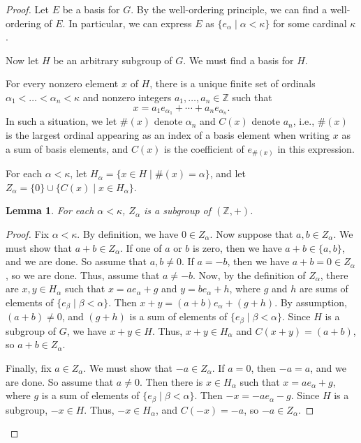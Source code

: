 \documentclass[a4paper]{memoir}
\newtheorem{lemma}[theorem]{Lemma}
\theoremstyle{definition}
\newcommand{\bb}{\mathbb}
\begin{document}
\begin{proof}
  Let $E$ be a basis for $G$. By the well-ordering principle, we can find a well-ordering of $E$. 
  In particular, we can express $E$ as $\{e_\alpha \mid \alpha < \kappa\}$ for some cardinal 
  $\kappa$.
  
  Now let $H$ be an arbitrary subgroup of $G$. We must find a basis for $H$.
  
  For every nonzero element $x$ of $H$, there is a unique finite set of ordinals 
  $\alpha_1 < \ldots < \alpha_n < \kappa$ and nonzero integers $a_1, \ldots, a_n \in \bb{Z}$ 
  such that
  \[
    x = a_1 e_{\alpha_1} + \cdots + a_n e_{\alpha_n}.
  \]
  In such a situation, we let $\#(x)$ denote $\alpha_n$ and $C(x)$ denote $a_n$, i.e., $\#(x)$ is the 
  largest ordinal appearing as an index of a basis element when writing $x$ as a sum of basis elements, 
  and $C(x)$ is the coefficient of $e_{\#(x)}$ in this expression.
  
  For each $\alpha < \kappa$, let $H_\alpha = \{x \in H \mid \#(x) = \alpha\}$, and let 
  $Z_\alpha = \{0\} \cup \{C(x) \mid x \in H_\alpha\}$.
  
  \begin{lemma}
    For each $\alpha < \kappa$, $Z_\alpha$ is a subgroup of $(\bb{Z}, +)$.
  \end{lemma}
  
  \begin{proof}
    Fix $\alpha < \kappa$. By definition, we have $0 \in Z_\alpha$. Now suppose that 
    $a,b \in Z_\alpha$. We must show that $a + b \in Z_\alpha$. If one of $a$ or $b$ is 
    zero, then we have $a + b \in \{a,b\}$, and we are done. So assume that $a,b \neq 0$. 
    If $a = -b$, then we have
    $a + b = 0 \in Z_\alpha$, so we are done. Thus, assume that $a \neq -b$.
    Now, by the definition of $Z_\alpha$, there are $x,y \in H_\alpha$ such that 
    $x = ae_\alpha + g$ and $y = be_\alpha + h$, where $g$ and $h$ are sums of elements of 
    $\{e_\beta \mid \beta < \alpha\}$. Then $x + y = (a + b) e_\alpha + (g + h)$. By 
    assumption, $(a + b) \neq 0$, and $(g + h)$ is a sum of elements of 
    $\{e_\beta \mid \beta < \alpha\}$. Since $H$ is a subgroup of $G$, we have 
    $x + y \in H$. Thus, $x + y \in H_\alpha$ and $C(x + y) = (a + b)$, so 
    $a + b \in Z_\alpha$.
    
    Finally, fix $a \in Z_\alpha$. We must show that $-a \in Z_\alpha$. If $a = 0$, 
    then $-a = a$, and we are done. So assume that $a \neq 0$. Then there is $x \in H_\alpha$ 
    such that $x = ae_\alpha + g$, where $g$ is a sum of elements of $\{e_\beta \mid 
    \beta < \alpha\}$. Then $-x = -ae_\alpha -g$. Since $H$ is a subgroup, $-x \in H$. 
    Thus, $-x \in H_\alpha$, and $C(-x) = -a$, so $-a \in Z_\alpha$.
  \end{proof}
  

\end{proof}
\end{document}
